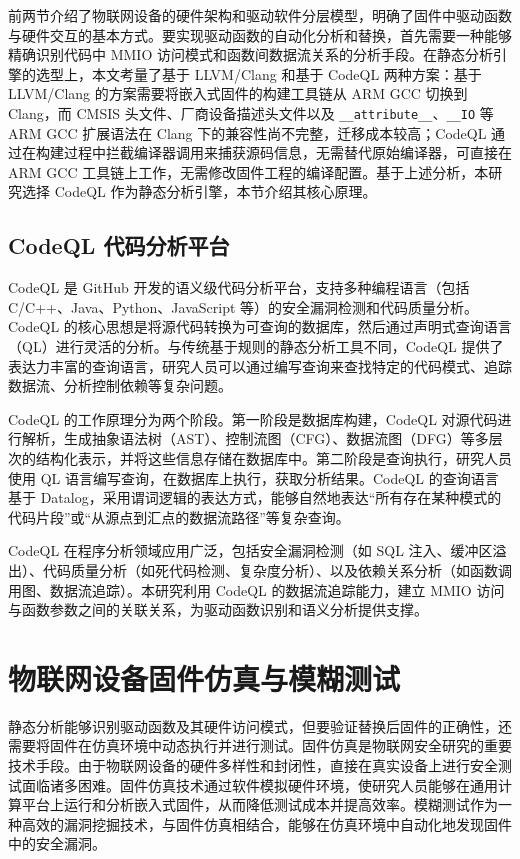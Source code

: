 前两节介绍了物联网设备的硬件架构和驱动软件分层模型，明确了固件中驱动函数与硬件交互的基本方式。要实现驱动函数的自动化分析和替换，首先需要一种能够精确识别代码中 MMIO 访问模式和函数间数据流关系的分析手段。在静态分析引擎的选型上，本文考量了基于 LLVM/Clang 和基于 CodeQL 两种方案：基于 LLVM/Clang 的方案需要将嵌入式固件的构建工具链从 ARM GCC 切换到 Clang，而 CMSIS 头文件、厂商设备描述头文件以及 \texttt{\_\_attribute\_\_}、\texttt{\_\_IO} 等 ARM GCC 扩展语法在 Clang 下的兼容性尚不完整，迁移成本较高；CodeQL 通过在构建过程中拦截编译器调用来捕获源码信息，无需替代原始编译器，可直接在 ARM GCC 工具链上工作，无需修改固件工程的编译配置。基于上述分析，本研究选择 CodeQL 作为静态分析引擎，本节介绍其核心原理。

\subsection{CodeQL 代码分析平台}

CodeQL 是 GitHub 开发的语义级代码分析平台，支持多种编程语言（包括 C/C++、Java、Python、JavaScript 等）的安全漏洞检测和代码质量分析。CodeQL 的核心思想是将源代码转换为可查询的数据库，然后通过声明式查询语言（QL）进行灵活的分析。与传统基于规则的静态分析工具不同，CodeQL 提供了表达力丰富的查询语言，研究人员可以通过编写查询来查找特定的代码模式、追踪数据流、分析控制依赖等复杂问题。

CodeQL 的工作原理分为两个阶段。第一阶段是数据库构建，CodeQL 对源代码进行解析，生成抽象语法树（AST）、控制流图（CFG）、数据流图（DFG）等多层次的结构化表示，并将这些信息存储在数据库中。第二阶段是查询执行，研究人员使用 QL 语言编写查询，在数据库上执行，获取分析结果。CodeQL 的查询语言基于 Datalog，采用谓词逻辑的表达方式，能够自然地表达“所有存在某种模式的代码片段”或“从源点到汇点的数据流路径”等复杂查询。

CodeQL 在程序分析领域应用广泛，包括安全漏洞检测（如 SQL 注入、缓冲区溢出）、代码质量分析（如死代码检测、复杂度分析）、以及依赖关系分析（如函数调用图、数据流追踪）。本研究利用 CodeQL 的数据流追踪能力，建立 MMIO 访问与函数参数之间的关联关系，为驱动函数识别和语义分析提供支撑。

\section{物联网设备固件仿真与模糊测试}
\label{sec:fuzz}

静态分析能够识别驱动函数及其硬件访问模式，但要验证替换后固件的正确性，还需要将固件在仿真环境中动态执行并进行测试。固件仿真是物联网安全研究的重要技术手段。由于物联网设备的硬件多样性和封闭性，直接在真实设备上进行安全测试面临诸多困难。固件仿真技术通过软件模拟硬件环境，使研究人员能够在通用计算平台上运行和分析嵌入式固件，从而降低测试成本并提高效率。模糊测试作为一种高效的漏洞挖掘技术，与固件仿真相结合，能够在仿真环境中自动化地发现固件中的安全漏洞。

